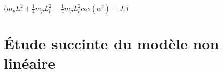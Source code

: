 \documentclass[12pt, a4paper, openany]{report}
\begin{document}

  $\bigg(m_{p}L_{r}^{2} + \frac{1}{4}m_{p}L_{p}^{2} - \frac{1}{4}m_{p}L_{p}^{2}cos(\alpha^{2}) + J_{r} \bigg)$

   


\section{Étude succinte du modèle non linéaire  }

                                                 


\end{document}
